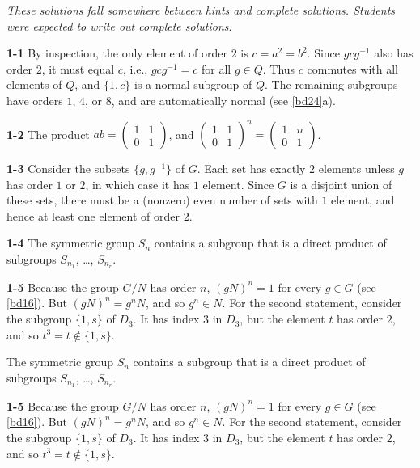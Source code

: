 \documentclass[a4paper,11pt,final]{memoir}%
\theoremstyle{nonumberplain}
\begin{document}
\textit{These solutions fall somewhere between hints
and complete solutions. Students were expected to write out complete
solutions}.

\bigskip\noindent\textbf{1-1}
By inspection, the only element of order $2$ is $c=a^{2}=b^{2}$. Since
$gcg^{-1}$ also has order $2$, it must equal $c$, i.e., $gcg^{-1}=c$ for all
$g\in Q$. Thus $c$ commutes with all elements of $Q$, and $\{1,c\}$ is a
normal subgroup of $Q$. The remaining subgroups have orders $1$, $4$, or $8$,
and are automatically normal (see \ref{bd24}a).

\bigskip\noindent\textbf{1-2}
The product $ab=%
\begin{pmatrix}
1 & 1\\
0 & 1
\end{pmatrix}
$, and $%
\begin{pmatrix}
1 & 1\\
0 & 1
\end{pmatrix}
^{n}=%
\begin{pmatrix}
1 & n\\
0 & 1
\end{pmatrix}
$.

\bigskip\noindent\textbf{1-3}
Consider the subsets $\{g,g^{-1}\}$ of $G$. Each set has exactly $2$ elements
unless $g$ has order $1$ or $2$, in which case it has $1$ element. Since $G$
is a disjoint union of these sets, there must be a (nonzero) even number of
sets with $1$ element, and hence at least one element of order $2$.

\bigskip\noindent\textbf{1-4}
The symmetric group $S_{n}$ contains a subgroup that is a direct product of
subgroups $S_{n_{1}}$, \ldots, $S_{n_{r}}$.

\bigskip\noindent\textbf{1-5}
Because the group $G/N$ has order $n$, $(gN)^{n}=1$ for every $g\in G$ (see
\ref{bd16}). But $(gN)^{n}=g^{n}N$, and so $g^{n}\in N$. For the second
statement, consider the subgroup $\{1,s\}$ of $D_{3}$. It has index $3$ in
$D_{3}$, but the element $t$ has order $2$, and so $t^{3}=t\notin\{1,s\}$.

The symmetric group $S_{n}$ contains a subgroup that is a direct product of
subgroups $S_{n_{1}}$, \ldots, $S_{n_{r}}$.

\medskip\noindent\textbf{1-5}
Because the group $G/N$ has order $n$, $(gN)^{n}=1$ for every $g\in G$ (see
\ref{bd16}). But $(gN)^{n}=g^{n}N$, and so $g^{n}\in N$. For the second
statement, consider the subgroup $\{1,s\}$ of $D_{3}$. It has index $3$ in
$D_{3}$, but the element $t$ has order $2$, and so $t^{3}=t\notin\{1,s\}$.
\end{document}
